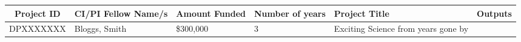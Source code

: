 \documentclass{arcpubs}
\begin{document}
\nocite{*}
\showbooks
\showchapters
\showarticles
\showproceedings

\begin{center}
\begin{tabularx}{\textwidth}{ |c|p{3cm}|p{2cm}|p{2cm}|X|p{2.5cm}| }
\hline
Project ID & CI/PI Fellow Name/s & Amount Funded & Number of years & Project Title & Outputs \\
\hline
DPXXXXXXX & Bloggs, Smith & \$300,000 & 3 & Exciting Science from years gone by & 
\cite{Jones2012} \\ %
\hline
\end{tabularx}
\end{center}
\end{document}
